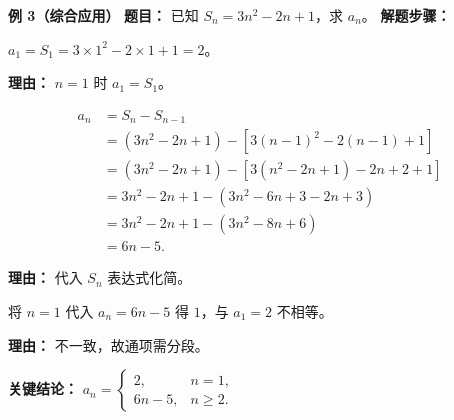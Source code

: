 \begin{examplebox}
	\medskip
	\textbf{\textcolor{CExample}{例 3（综合应用）}}
	\textbf{\textcolor{CExample}{题目：}}
	已知 $S_n = 3n^2 - 2n + 1$，求 $a_n$。
	\textbf{\textcolor{CExample}{解题步骤：}}
	\begin{description}[style=nextline, leftmargin=2.8em, labelsep=0.5em, itemsep=0.45em]
		\item[\textbf{第一步（求首项）：}]
			$a_1 = S_1 = 3\times1^2 -2\times1+1 = 2$。
			\par\textbf{理由：} $n=1$ 时 $a_1=S_1$。
		\item[\textbf{第二步（求 $n\ge2$ 通项）：}]
			\[
				\begin{aligned}
					a_n &= S_n - S_{n-1} \\ &= (3n^2-2n+1) - [3(n-1)^2-2(n-1)+1] \\ &= (3n^2-2n+1) - [3(n^2-2n+1)-2n+2+1] \\ &= 3n^2-2n+1 - (3n^2-6n+3-2n+3) \\ &= 3n^2-2n+1 - (3n^2-8n+6) \\ &= 6n-5.
			\end{aligned}
			\]
			\par\textbf{理由：} 代入 $S_n$ 表达式化简。
		\item[\textbf{第三步（验证 $n=1$ 并输出）：}]
			将 $n=1$ 代入 $a_n=6n-5$ 得 $1$，与 $a_1=2$ 不相等。
			\par\textbf{理由：} 不一致，故通项需分段。
	\end{description}
	\textbf{\textcolor{CExample}{关键结论：}}
	\textbf{$a_n =
	\begin{cases}
		2, & n=1,\\ 6n-5, & n\ge2.
	\end{cases}
	$}
\end{examplebox}
